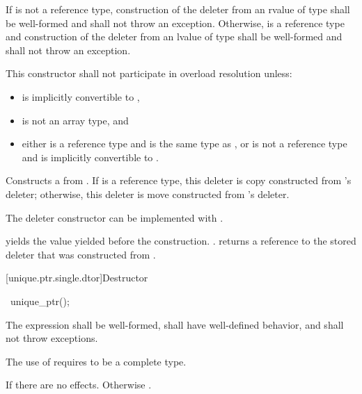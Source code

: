 \begin{itemdescr}
\pnum
\requires If  is not a reference type,
construction of the deleter from an rvalue of type
 shall be well-formed and shall not throw an exception.
Otherwise,  is a reference type and construction of the deleter from an
lvalue of type  shall be well-formed and shall not throw an exception.

\pnum
\remarks This constructor shall not participate in overload resolution unless:

\begin{itemize}
\item {} is implicitly convertible to ,
\item {} is not an array type, and
\item either  is a reference type and  is the same type as , or
 is not a reference type and  is implicitly convertible to .
\end{itemize}

\pnum
\effects Constructs a  from .
If  is a reference type, this deleter is copy constructed from
's deleter; otherwise, this deleter is move constructed from 's
deleter. \begin{note} The deleter constructor can be implemented with
. \end{note}

\pnum
\ensures {} yields the value 
yielded before the construction. .
 returns a reference
to the stored deleter that was constructed from
.
\end{itemdescr}

[unique.ptr.single.dtor]{Destructor}

%
\begin{itemdecl}
~unique_ptr();
\end{itemdecl}

\begin{itemdescr}
\pnum
\requires The expression  shall be well-formed,
shall have well-defined behavior, and shall not throw exceptions. \begin{note} The
use of  requires  to be a complete type.
\end{note}

\pnum
\effects If  there are no effects.
Otherwise .
\end{itemdescr}

